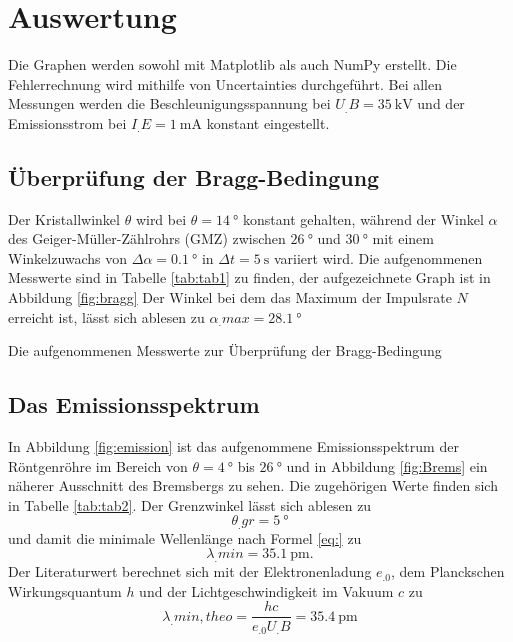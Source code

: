\section{Auswertung}
\label{sec:Auswertung}


Die Graphen werden sowohl mit Matplotlib \cite{matplotlib} als auch NumPy \cite{numpy} erstellt. Die Fehlerrechnung wird mithilfe von Uncertainties \cite{uncertainties} durchgeführt.
Bei allen Messungen werden die Beschleunigungsspannung bei $U_.B=\SI{35}{\kilo\volt}$ und der Emissionsstrom bei $I_.E=\SI{1}{\milli\ampere}$ konstant eingestellt.

\subsection{Überprüfung der Bragg-Bedingung}
Der Kristallwinkel $\theta$ wird bei $\theta= \SI{14}{\degree}$ konstant gehalten, während der Winkel $\alpha$ des Geiger-Müller-Zählrohrs (GMZ) zwischen $\SI{26}{\degree}$ und $\SI{30}{\degree}$ mit einem Winkelzuwachs von $\Delta \alpha = \SI{0,1}{\degree}$ in $\Delta t = \SI{5}{\second}$ variiert wird.
Die aufgenommenen Messwerte sind in Tabelle \ref{tab:tab1} zu finden, der aufgezeichnete Graph ist in Abbildung \ref{fig:bragg}
Der Winkel bei dem das Maximum der Impulsrate $N$ erreicht ist, lässt sich ablesen zu $\alpha_.{max}=\SI{28,1}{\degree}$

\begin{table}
\centering
\caption{Die aufgenommenen Messwerte zur Überprüfung der Bragg-Bedingung}

\label{tab:tab1}
\end{table}

\subsection{Das Emissionsspektrum}
In Abbildung \ref{fig:emission} ist das aufgenommene Emissionsspektrum der Röntgenröhre im Bereich von $\theta=\SI{4}{\degree}$ bis $\SI{26}{\degree}$ und in Abbildung \ref{fig:Brems} ein näherer Ausschnitt des Bremsbergs zu sehen. Die zugehörigen Werte finden sich in Tabelle \ref{tab:tab2}.
Der Grenzwinkel lässt sich ablesen zu 
\[\theta_.{gr}=\SI{5}{\degree}\]
und damit die minimale Wellenlänge nach Formel \eqref{eq:} zu
\[
\lambda_.{min}=\SI{35,1}{\pico\metre}\text{.}
\]
Der Literaturwert berechnet sich mit der Elektronenladung $e_.0$, dem Planckschen Wirkungsquantum $h$ und der Lichtgeschwindigkeit im Vakuum $c$ zu
\[
\lambda_.{min,theo}=\frac{hc}{e_.0U_.B}=\SI{35,4}{\pico\metre}
\]